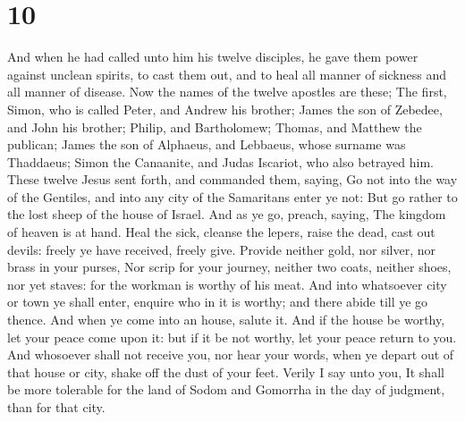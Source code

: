 \hypertarget{section-9}{%
\section{10}\label{section-9}}

 And when he had called unto him his twelve disciples, he
gave them power against unclean spirits, to cast them out, and to heal
all manner of sickness and all manner of disease.  Now the
names of the twelve apostles are these; The first, Simon, who is called
Peter, and Andrew his brother; James the son of Zebedee, and John his
brother;  Philip, and Bartholomew; Thomas, and Matthew the
publican; James the son of Alphaeus, and Lebbaeus, whose surname was
Thaddaeus;  Simon the Canaanite, and Judas Iscariot, who
also betrayed him.  These twelve Jesus sent forth, and
commanded them, saying, Go not into the way of the Gentiles, and into
any city of the Samaritans enter ye not:  But go rather to
the lost sheep of the house of Israel.  And as ye go,
preach, saying, The kingdom of heaven is at hand.  Heal the
sick, cleanse the lepers, raise the dead, cast out devils: freely ye
have received, freely give.  Provide neither gold, nor
silver, nor brass in your purses,  Nor scrip for your
journey, neither two coats, neither shoes, nor yet staves: for the
workman is worthy of his meat.  And into whatsoever city or
town ye shall enter, enquire who in it is worthy; and there abide till
ye go thence.  And when ye come into an house, salute it.
 And if the house be worthy, let your peace come upon it:
but if it be not worthy, let your peace return to you.  And
whosoever shall not receive you, nor hear your words, when ye depart out
of that house or city, shake off the dust of your feet. 
Verily I say unto you, It shall be more tolerable for the land of Sodom
and Gomorrha in the day of judgment, than for that city.

